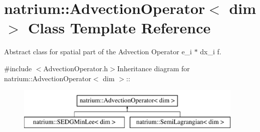 \hypertarget{classnatrium_1_1AdvectionOperator}{
\section{natrium::AdvectionOperator$<$ dim $>$ Class Template Reference}
\label{classnatrium_1_1AdvectionOperator}
}


Abstract class for spatial part of the Advection Operator e\_\-i $\ast$ dx\_\-i f.  


{\ttfamily \#include $<$AdvectionOperator.h$>$}Inheritance diagram for natrium::AdvectionOperator$<$ dim $>$::\begin{figure}[H]
\begin{center}
\leavevmode
\includegraphics[height=2cm]{classnatrium_1_1AdvectionOperator}
\end{center}
\end{figure}
